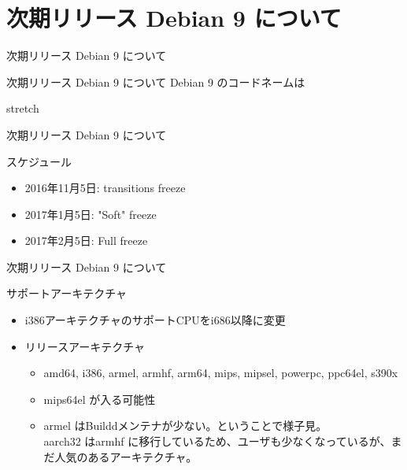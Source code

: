 \section{次期リリース Debian 9 について}
\begin{frame}\begin{center}\Huge{次期リリース Debian 9 について}\end{center}\end{frame}

\begin{frame}{次期リリース Debian 9 について}%
Debian 9 のコードネームは \pause \\
 \begin{center}
{\Huge stretch} \pause
 \end{center}
\end{frame}

\begin{frame}{次期リリース Debian 9 について}%

スケジュール

\begin{itemize}
\item 2016年11月5日: transitions freeze
\item 2017年1月5日: "Soft" freeze
\item 2017年2月5日: Full freeze
\end{itemize}

\end{frame}

\begin{frame}{次期リリース Debian 9 について}%

サポートアーキテクチャ
\begin{itemize}
\item i386アーキテクチャのサポートCPUをi686以降に変更
\item リリースアーキテクチャ
\begin{itemize}
\item amd64, i386, armel, armhf, arm64, mips, mipsel, powerpc, ppc64el, s390x
\item mips64el が入る可能性
\item armel はBuilddメンテナが少ない。ということで様子見。\\
	aarch32 はarmhf に移行しているため、ユーザも少なくなっているが、まだ人気のあるアーキテクチャ。
\end{itemize}
\end{itemize}

\end{frame}


